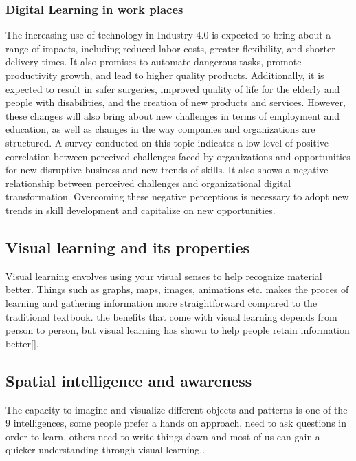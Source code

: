 \subsubsection*{Digital Learning in work places}\label{sec:digital_learning_work_places}

The increasing use of technology in Industry 4.0 is expected to bring about a range of impacts, including reduced labor costs, greater flexibility, and shorter delivery times. It also promises to automate dangerous tasks, promote productivity growth, and lead to higher quality products.
Additionally, it is expected to result in safer surgeries, improved quality of life for the elderly and people with disabilities, and the creation of new products and services. However, these changes will also bring about new challenges in terms of employment and education, as well as changes in the way companies and organizations are structured.
A survey conducted on this topic indicates a low level of positive correlation between perceived challenges faced by organizations and opportunities for new disruptive business and new trends of skills.
It also shows a negative relationship between perceived challenges and organizational digital transformation. Overcoming these negative perceptions is necessary to adopt new trends in skill development and capitalize on new opportunities.\cite*{Skills_Digital_Learning}

\subsection{Visual learning and its properties}\label{sec:visual_learning_and_its_properties}
Visual learning envolves using your visual senses to help recognize material better. Things such as graphs, maps, images, animations etc. makes the proces of learning and gathering information more straightforward
compared to the traditional textbook. the benefits that come with visual learning depends from person to person, but visual learning has shown to help people retain information better[].


\subsection{Spatial intelligence and awareness}\label{sec:spatial_intelligence_and_awareness}
The capacity to imagine and visualize different objects and patterns is one of the 9 intelligences, some people prefer a hands on approach, need to ask questions in order to learn, others need to write things down and most of us can gain a quicker understanding through visual learning.\cite*{pracpsych2022}.


